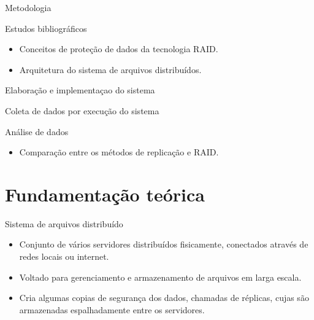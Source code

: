 \begin{frame}{Metodologia}
	
	\begin{block}{Estudos bibliográficos}
		\begin{itemize}
			\item Conceitos de proteção de dados da tecnologia RAID.
			\item Arquitetura do sistema de arquivos distribuídos.
		\end{itemize}
	\end{block}
	
	\begin{block}{Elaboração e implementaçao do sistema}
		
	\end{block}
	
	\begin{block}{Coleta de dados por execução do sistema}
		
	\end{block}
	
	\begin{block}{Análise de dados}
		\begin{itemize}
			\item Comparação entre os métodos de replicação e RAID.
		\end{itemize}
		
	\end{block}
	
\end{frame}

\section{Fundamentação teórica}

\begin{frame}{Sistema de arquivos distribuído}
	\begin{itemize}
		\item Conjunto de vários servidores distribuídos fisicamente, conectados através de redes locais ou internet.
		\item Voltado para gerenciamento e armazenamento de arquivos em larga escala.
		\item Cria algumas copias de segurança dos dados, chamadas de réplicas, cujas são armazenadas espalhadamente entre os servidores.
	\end{itemize}
\end{frame}

